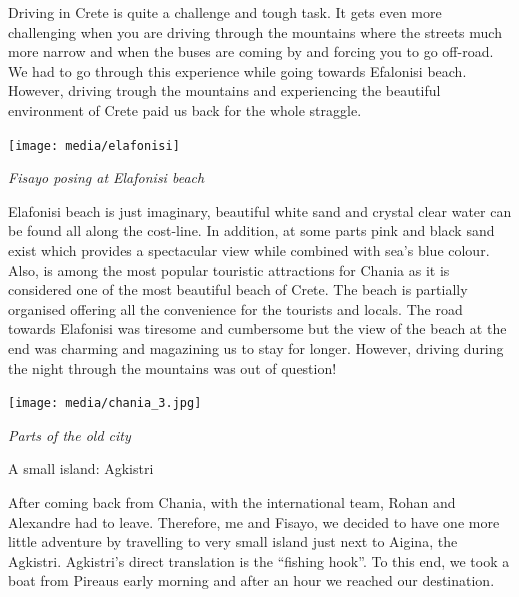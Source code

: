 \documentclass[10pt,a4paper]{article} %
\newcommand{\NewsItem}[1]{ %
\usefont{T1}{fvs}{n}{n} %
\vspace{24pt}\large #1\vspace{3pt} %
\par \normalsize \normalfont}
\begin{document}
\begin{multicols}{3}
Driving in Crete is quite a challenge and tough task. 
It gets even more challenging when you are driving through the mountains 
where the streets much more narrow and when the buses are coming by and 
forcing you to go off-road. 
We had to go through this experience while going towards Efalonisi beach. 
However, driving trough the mountains and experiencing the beautiful environment 
of Crete paid us back for the whole straggle.


\begin{center}
	\texttt{[image: media/elafonisi]}
	\par\textit{Fisayo posing at Elafonisi beach}
\end{center}


Elafonisi beach is just imaginary, beautiful white sand and crystal clear water 
can be found all along the cost-line. 
In addition, at some parts pink and black sand exist which provides a spectacular 
view while combined with sea's blue colour. 
Also, is among the most popular touristic attractions for Chania as it is considered 
one of the most beautiful beach of Crete. 
The beach is partially organised offering all the convenience for the tourists and 
locals. 
The road towards Elafonisi was tiresome and cumbersome but the view of the beach 
at the end was charming and magazining us to stay for longer. 
However, driving during the night through the mountains was out of question!

\begin{center}
	\texttt{[image: media/chania\_3.jpg]}
	\par\textit{Parts of the old city}
\end{center}



\NewsItem{A small island: Agkistri}

After coming back from Chania, with the international team, Rohan and Alexandre 
had to leave. 
Therefore, me and Fisayo, we decided to have one more little adventure by travelling 
to very small island just next to Aigina, the Agkistri. 
Agkistri's direct translation is the ``fishing hook''. 
To this end, we took a boat from Pireaus early morning and after an hour we 
reached our destination.



\end{multicols}
\end{document}
